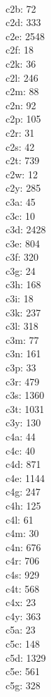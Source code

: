 \begin{multicols}{8}
  \\c2b: 72
  \\c2d: 333
  \\c2e: 2548
  \\c2f: 18
  \\c2k: 36
  \\c2l: 246
  \\c2m: 88
  \\c2n: 92
  \\c2p: 105
  \\c2r: 31
  \\c2s: 42
  \\c2t: 739
  \\c2w: 12
  \\c2y: 285
  \\c3a: 45
  \\c3c: 10
  \\c3d: 2428
  \\c3e: 804
  \\c3f: 320
  \\c3g: 24
  \\c3h: 168
  \\c3i: 18
  \\c3k: 237
  \\c3l: 318
  \\c3m: 77
  \\c3n: 161
  \\c3p: 33
  \\c3r: 479
  \\c3s: 1360
  \\c3t: 1031
  \\c3y: 130
  \\c4a: 44
  \\c4c: 40
  \\c4d: 871
  \\c4e: 1144
  \\c4g: 247
  \\c4h: 125
  \\c4l: 61
  \\c4m: 30
  \\c4n: 676
  \\c4r: 706
  \\c4s: 929
  \\c4t: 568
  \\c4x: 23
  \\c4y: 363
  \\c5a: 23
  \\c5c: 148
  \\c5d: 1329
  \\c5e: 561
  \\c5g: 328

\end{multicols}
